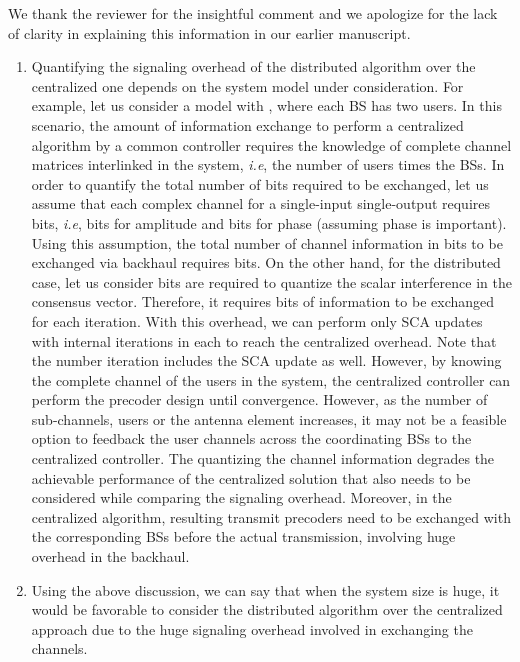 \begin{enumerate}
\resp
	We thank the reviewer for the insightful comment and we apologize for the lack of clarity in explaining this information in our earlier manuscript.
	\begin{enumerate}
		\item Quantifying the signaling overhead of the distributed algorithm over the centralized one depends on the system model under consideration. For example, let us consider a model with , where each \ac{BS} has two users. In this scenario, the amount of information exchange to perform a centralized algorithm by a common controller requires the knowledge of complete channel matrices interlinked in the system, \textit{i.e}, the number of users times the \acp{BS}. In order to quantify the total number of bits required to be exchanged, let us assume that each complex channel for a single-input single-output requires  bits, \textit{i.e},  bits for amplitude and  bits for phase (assuming phase is important). Using this assumption, the total number of channel information in bits to be exchanged via backhaul requires  bits. On the other hand, for the distributed case, let us consider  bits are required to quantize the scalar interference in the consensus vector. Therefore, it requires  bits of information to be exchanged for each iteration. With this overhead, we can perform only  \ac{SCA} updates with  internal iterations in each to reach the centralized overhead. Note that the number iteration includes the \ac{SCA} update as well. However, by knowing the complete channel of the users in the system, the centralized controller can perform the precoder design until convergence. However, as the number of sub-channels, users or the antenna element increases, it may not be a feasible option to feedback the user channels across the coordinating \acp{BS} to the centralized controller. The quantizing the channel information degrades the achievable performance of the centralized solution that also needs to be considered while comparing the signaling overhead. Moreover, in the centralized algorithm, resulting transmit precoders need to be exchanged with the corresponding \acp{BS} before the actual transmission, involving huge overhead in the backhaul.
		\item Using the above discussion, we can say that when the system size is huge, it would be favorable to consider the distributed algorithm over the centralized approach due to the huge signaling overhead involved in exchanging the channels.

\end{enumerate}
\end{enumerate}
